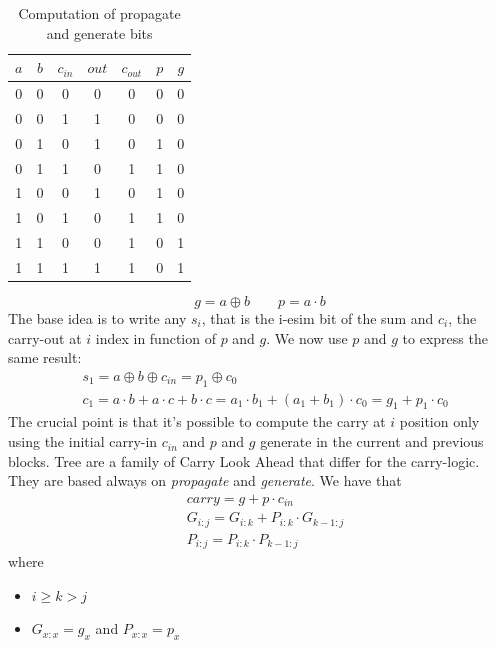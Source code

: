 \begin{itemize}
	\begin{table}[H]
		\begin{center}
			\begin{tabular}{ c c c | c c | c c}
				$a$ & $b$ & $c_{in}$ & $out$ & $c_{out}$ & $p$ & $g$ \\
				\hline
				0 & 0 & 0 & 0 & 0 & 0 & 0\\ 
				0 & 0 & 1 & 1 & 0 & 0 & 0\\ 
				0 & 1 & 0 & 1 & 0 & 1 & 0\\ 
				0 & 1 & 1 & 0 & 1 & 1 & 0\\ 
				1 & 0 & 0 & 1 & 0 & 1 & 0\\ 
				1 & 0 & 1 & 0 & 1 & 1 & 0\\ 
				1 & 1 & 0 & 0 & 1 & 0 & 1\\ 
				1 & 1 & 1 & 1 & 1 & 0 & 1\\ 
			\end{tabular}
			\caption{Computation of propagate and generate bits}
		\end{center}
	\end{table}
	\begin{equation} \label{eq:pandg}
		g = a \oplus b \quad\quad p = a \cdot b
	\end{equation}
	The base idea is to write any $s_i$, that is the i-esim bit of the sum and $c_i$, the carry-out at $i$ index in function of $p$ and $g$.
	We now use $p$ and $g$ to express the same result:
	\begin{align*}
		& s_1 = a \oplus b \oplus c_{in} = p_1 \oplus c_0\\
		& c_1 = a \cdot b + a \cdot c + b \cdot c = a_1 \cdot b_1 + (a_1 + b_1) \cdot c_0 =  g_1 + p_1 \cdot c_0
	\end{align*}
	The crucial point is that it's possible to compute the carry at $i$ position only using the initial carry-in $c_{in}$ and $p$ and $g$ generate in the current and previous blocks. Tree are a family of Carry Look Ahead that differ for the carry-logic. They are based always on \textit{propagate} and \textit{generate}. We have that 	
	\begin{align*}
		& carry = g + p \cdot c_{in}\\
		& G_{i:j} = G_{i:k} + P_{i:k} \cdot G_{k-1:j}\\
		& P_{i:j} = P_{i:k} \cdot P_{k-1:j}
	\end{align*}
	where
	\begin{itemize}
		\itemsep0sp
		\item $i \ge k > j$
		\item $G_{x:x} = g_x$ and $P_{x:x} = p_x$

\end{itemize}
\end{itemize}
